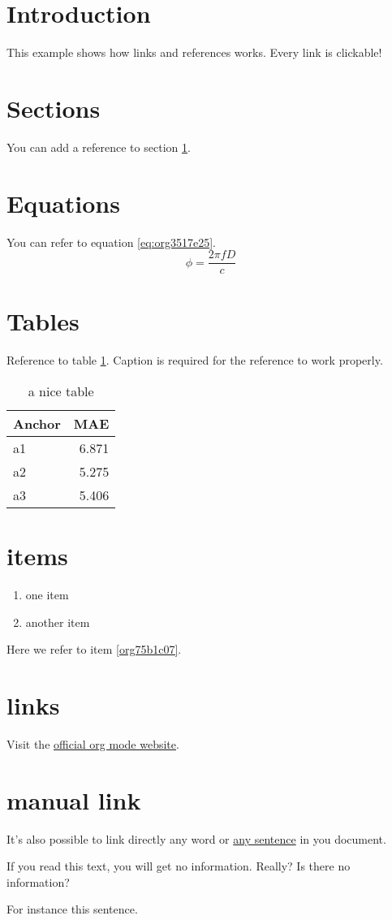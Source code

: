 


\section{Introduction}
\label{sec:org772037f}
This example shows how links and references works.
Every link is clickable!

\section{Sections}
\label{sec:org8172ac5}
You can add a reference to section \ref{sec:org772037f}.

\section{Equations}
\label{sec:orgba07c56}
You can refer to equation \ref{eq:org3517e25}.
\begin{equation}
\label{eq:org3517e25}
\phi = \frac{2\pi fD}{c}
\end{equation}

\section{Tables}
\label{sec:org14ad214}
Reference to table \ref{tab:org62ab956}.
Caption is required for the reference to work properly.

\begin{table}[htbp]
\caption{\label{tab:org62ab956}
a nice table}
\centering
\begin{tabular}{lr}
Anchor & MAE\\
\hline
a1 & 6.871\\
a2 & 5.275\\
a3 & 5.406\\
\end{tabular}
\end{table}

\section{items}
\label{sec:org15748a9}
\begin{enumerate}
\item one item
\item \label{org75b1c07}another item
\end{enumerate}
Here we refer to item \ref{org75b1c07}.

\section{links}
\label{sec:orgd9a92ec}
Visit the \href{https://orgmode.org/}{official org mode website}.

\section{manual link}
\label{sec:org43b62d4}
It's also possible to link directly any word
or \hyperlink{thesentence}{any sentence} in you document.

If you read this text, you will get no information.  Really?
Is there no information?

For instance \hypertarget{thesentence}{this sentence}.


